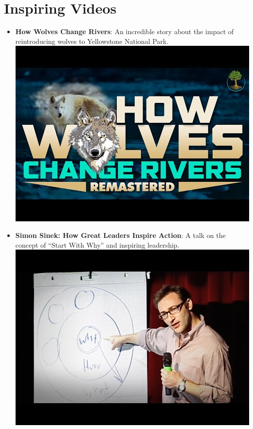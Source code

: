 \documentclass[
  letterpaper,
  DIV=11,
  numbers=noendperiod]{scrreprt}
\begin{document}
\section{Inspiring Videos 🎥}\label{inspiring-videos-1}

\begin{itemize}
\item
  \textbf{How Wolves Change Rivers}: An incredible story about the
  impact of reintroducing wolves to Yellowstone National Park.
  \href{https://www.youtube.com/watch?v=W88Sact1kws}{\includegraphics{index_files/mediabag/01234.jpg}}
\item
  \textbf{Simon Sinek: How Great Leaders Inspire Action}: A talk on the
  concept of ``Start With Why'' and inspiring leadership.
  \href{https://www.youtube.com/watch?v=qp0HIF3SfI4}{\includegraphics{index_files/mediabag/01.jpg}}

\end{itemize}
\end{document}
